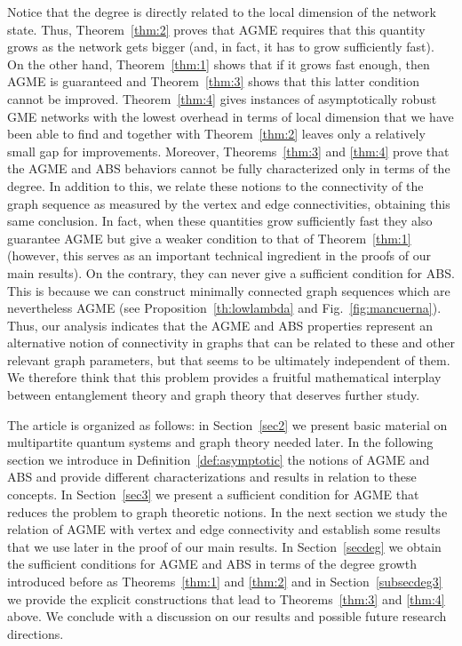 \documentclass[a4paper,onecolumn,accepted=2024-12-14]{quantumarticle}
\theoremstyle{plain}
\begin{document}
Notice that the degree is directly related to the local dimension of the network state. Thus, Theorem~\ref{thm:2} proves that AGME requires that this quantity grows as the network gets bigger (and, in fact, it has to grow sufficiently fast). On the other hand, Theorem~\ref{thm:1} shows that if it grows fast enough, then AGME is guaranteed and Theorem~\ref{thm:3} shows that this latter condition cannot be improved. Theorem~\ref{thm:4} gives instances of asymptotically robust GME networks with the lowest overhead in terms of local dimension that we have been able to find and together with Theorem~\ref{thm:2} leaves only a relatively small gap for improvements. Moreover, Theorems~\ref{thm:3} and
\ref{thm:4} prove that the AGME and ABS behaviors cannot be fully characterized only in terms of the degree. In addition to this, we relate these notions to the connectivity of the graph sequence as measured by the vertex and edge connectivities, obtaining this same conclusion. In fact, when these quantities grow sufficiently fast they also guarantee AGME but give a weaker condition to that of Theorem~\ref{thm:1} (however, this serves as an important technical ingredient in the proofs of our main results). On the contrary, they can never give a sufficient condition for ABS. This is because we can construct minimally connected graph sequences which are nevertheless AGME (see Proposition~\ref{th:lowlambda} and Fig.~\ref{fig:mancuerna}). Thus, our analysis indicates that the AGME and ABS properties represent an alternative notion of connectivity in graphs that can be related to these and other relevant graph parameters, but that seems to be ultimately independent of them. We therefore think that this problem provides a fruitful mathematical interplay between entanglement theory and graph theory that deserves further study.



The article is organized as follows: in Section~\ref{sec2} we present basic material on multipartite quantum systems and graph theory needed later. In the following section we introduce in Definition~\ref{def:asymptotic} the notions of AGME and ABS and provide different characterizations and results in relation to these concepts.
In Section~\ref{sec3} we present a sufficient condition for AGME that reduces the problem to graph theoretic notions. In the next section we study the relation of AGME with vertex and edge connectivity and establish some results that we use later in the proof of our main results. In Section~\ref{secdeg} we obtain the sufficient conditions for AGME and ABS in terms of the degree growth introduced before as Theorems~\ref{thm:1} and \ref{thm:2} and in Section~\ref{subsecdeg3} we provide the explicit constructions that lead to Theorems~\ref{thm:3} and \ref{thm:4} above. We conclude with a discussion on our results and possible future research directions.
\end{document}

